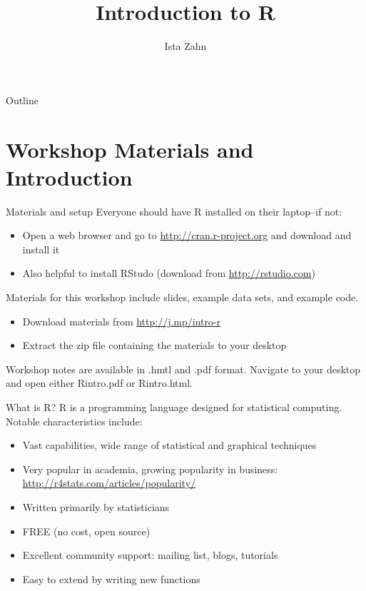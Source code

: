 \documentclass[table,smaller]{beamer}
\institute{Harvard MIT Data Center}
\author{Ista Zahn}
\date{}
\title{Introduction to R}
\begin{document}
\maketitle
\begin{frame}{Outline}
\tableofcontents
\end{frame}


\section{Workshop Materials and Introduction}
\label{sec-1}


\begin{frame}[label=sec-1-1]{Materials and setup}
Everyone should have R installed on their laptop--if not:

\begin{itemize}
\item Open a web browser and go to \url{http://cran.r-project.org} and download and install it
\item Also helpful to install RStudo (download from \url{http://rstudio.com})
\end{itemize}

Materials for this workshop include slides, example data sets, and example code.

\begin{itemize}
\item Download materials from \url{http://j.mp/intro-r}
\item Extract the zip file containing the materials to your desktop
\end{itemize}

Workshop notes are available in .hmtl and .pdf format. Navigate to your desktop and open either Rintro.pdf or Rintro.html.
\end{frame}
\begin{frame}[label=sec-1-2]{What is R?}
R is a programming language designed for statistical computing. Notable characteristics include:

\begin{itemize}
\item Vast capabilities, wide range of statistical and graphical techniques

\item Very popular in academia, growing popularity in business: \url{http://r4stats.com/articles/popularity/}

\item Written primarily by statisticians

\item FREE (no cost, open source)

\item Excellent community support: mailing list, blogs, tutorials

\item Easy to extend by writing new functions
\end{itemize}
\end{frame}
\end{document}
